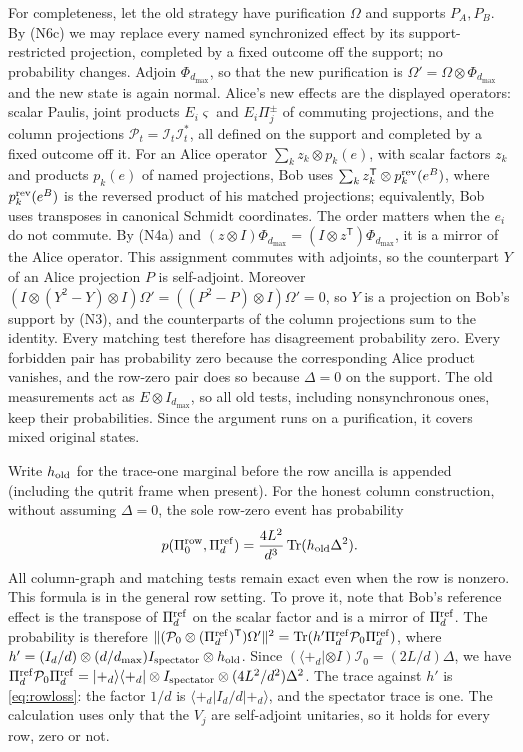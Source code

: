 For completeness, let the old strategy have purification $\Omega$ and supports $P_A,P_B$. By (N6c) we may replace every named synchronized effect by its support-restricted projection, completed by a fixed outcome off the support; no probability changes. Adjoin $\Phi_{d_{\max}}$, so that the new purification is $\Omega'=\Omega\otimes\Phi_{d_{\max}}$ and the new state is again normal. Alice's new effects are the displayed operators: scalar Paulis, joint products $E_i\varsigma$ and $E_i\Pi_j^\pm$ of commuting projections, and the column projections $\mathcal P_t=\mathcal I_t\mathcal I_t^*$, all defined on the support and completed by a fixed outcome off it. For an Alice operator $\sum_kz_k\otimes p_k(e)$, with scalar factors $z_k$ and products $p_k(e)$ of named projections, Bob uses $\sum_kz_k^{\mathsf T}\otimes p^{\rm rev}_k(e^B)$, where $p^{\rm rev}_k(e^B)$ is the reversed product of his matched projections; equivalently, Bob uses transposes in canonical Schmidt coordinates. The order matters when the $e_i$ do not commute. By (N4a) and $(z\otimes I)\Phi_{d_{\max}}=(I\otimes z^{\mathsf T})\Phi_{d_{\max}}$, it is a mirror of the Alice operator. This assignment commutes with adjoints, so the counterpart $Y$ of an Alice projection $P$ is self-adjoint. Moreover $(I\otimes(Y^2-Y)\otimes I)\Omega'=((P^2-P)\otimes I)\Omega'=0$, so $Y$ is a projection on Bob's support by (N3), and the counterparts of the column projections sum to the identity. Every matching test therefore has disagreement probability zero. Every forbidden pair has probability zero because the corresponding Alice product vanishes, and the row-zero pair does so because $\Delta=0$ on the support. The old measurements act as $E\otimes I_{d_{\max}}$, so all old tests, including nonsynchronous ones, keep their probabilities. Since the argument runs on a purification, it covers mixed original states.


Write $h_{\rm old}$ for the trace-one marginal before the row ancilla is appended (including the qutrit frame when present). For the honest column construction, without assuming $\Delta=0$, the sole row-zero event has probability
\begin{equation}\label{eq:rowloss}
 p(\Pi^{\rm row}_0,\Pi^{\rm ref}_d)=\frac{4L^2}{d^3}\operatorname{Tr}(h_{\rm old}\Delta^2).
\end{equation}
All column-graph and matching tests remain exact even when the row is nonzero. This formula is \cite[Eq.~(32)]{Entropy} in the general row setting. To prove it, note that Bob's reference effect is the transpose of $\Pi^{\rm ref}_d$ on the scalar factor and is a mirror of $\Pi^{\rm ref}_d$. The probability is therefore $\|(\mathcal P_0\otimes (\Pi^{\rm ref}_d)^{\mathsf T})\Omega'\|^2=\operatorname{Tr}(h'\Pi^{\rm ref}_d\mathcal P_0\Pi^{\rm ref}_d)$, where $h'=(I_d/d)\otimes(d/d_{\max})I_{\rm spectator}\otimes h_{\rm old}$. Since $(\langle+_d|\otimes I)\mathcal I_0=(2L/d)\Delta$, we have $\Pi^{\rm ref}_d\mathcal P_0\Pi^{\rm ref}_d=|+_d\rangle\langle+_d|\otimes I_{\rm spectator}\otimes(4L^2/d^2)\Delta^2$. The trace against $h'$ is \eqref{eq:rowloss}: the factor $1/d$ is $\langle+_d|I_d/d|+_d\rangle$, and the spectator trace is one. The calculation uses only that the $V_j$ are self-adjoint unitaries, so it holds for every row, zero or not.


